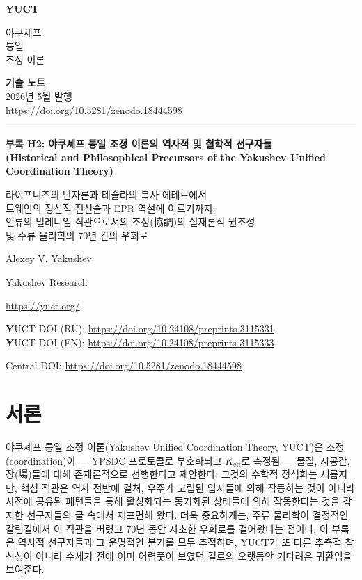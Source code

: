 \documentclass[12pt,a4paper]{article}
\newcommand{\makeheader}{%
	\noindent
	\begin{minipage}{0.17\textwidth}
		\raggedright
		{\sffamily\bfseries\color{skyblue}\fontsize{46}{46}\selectfont YUCT}%
	\end{minipage}%
	\hspace{30pt}
	\begin{minipage}{0.32\textwidth}
		\raggedright
		{\sffamily\fontsize{11}{13}\selectfont 야쿠셰프\\ 통일\\ 조정 이론}%
	\end{minipage}%
	\hfill
	\begin{minipage}{0.38\textwidth}
		\raggedleft
		{\sffamily\bfseries 기술 노트}\\ 
		{\sffamily 2026년 5월 발행}\\ 
		{\sffamily\footnotesize \scriptsize \url{https://doi.org/10.5281/zenodo.18444598}}%
	\end{minipage}
	\par\vspace{5pt}
	\noindent\textcolor{gold}{\rule{\textwidth}{1.6pt}}
	\par\vspace{0pt}
}
\begin{document}
	\makeheader
	\thispagestyle{firstpage}
	\vspace*{1cm}
	
	\begin{center}
		{\fontsize{28}{32}\selectfont\bfseries\color{darkblue} 부록 H2: 야쿠셰프 통일 조정 이론의 역사적 및 철학적 선구자들\\
			(Historical and Philosophical Precursors of the Yakushev Unified Coordination Theory)}
		
		\vspace{1cm}
		\large
		라이프니츠의 단자론과 테슬라의 복사 에테르에서\\
		트웨인의 정신적 전신술과 EPR 역설에 이르기까지:\\
		인류의 밀레니엄 직관으로서의 조정(協調)의 실재론적 원초성\\
		및 주류 물리학의 70년 간의 우회로
	\end{center}
	
	{\large Alexey V. Yakushev\par}
	\vspace{0.3cm}
	{\normalsize Yakushev Research\par}
	{\normalsize \url{https://yuct.org/}\par}
	
	\vspace{2cm}
	\large 
	\textbf YUCT DOI (RU): \url{https://doi.org/10.24108/preprints-3115331} \\
	\textbf YUCT DOI (EN): \url{https://doi.org/10.24108/preprints-3115333}
	
	\vspace{1cm}
	
	\vspace{0cm}
	\small
	Central DOI: \url{https://doi.org/10.5281/zenodo.18444598} \\
	
	\newpage
	\section{서론}
	
	야쿠셰프 통일 조정 이론(Yakushev Unified Coordination Theory, YUCT)은 조정(coordination)이 --- YPSDC 프로토콜로 부호화되고 \(K_{\mathrm{eff}}\)로 측정됨 --- 물질, 시공간, 장(場)들에 대해 존재론적으로 선행한다고 제안한다. 그것의 수학적 정식화는 새롭지만, 핵심 직관은 역사 전반에 걸쳐, 우주가 고립된 입자들에 의해 작동하는 것이 아니라 사전에 공유된 패턴들을 통해 활성화되는 동기화된 상태들에 의해 작동한다는 것을 감지한 선구자들의 글 속에서 재표면해 왔다. 더욱 중요하게는, 주류 물리학이 결정적인 갈림길에서 이 직관을 버렸고 70년 동안 자초한 우회로를 걸어왔다는 점이다. 이 부록은 역사적 선구자들과 그 운명적인 분기를 모두 추적하며, YUCT가 또 다른 추측적 참신성이 아니라 수세기 전에 이미 어렴풋이 보였던 길로의 오랫동안 기다려온 귀환임을 보여준다.
	
\end{document}

